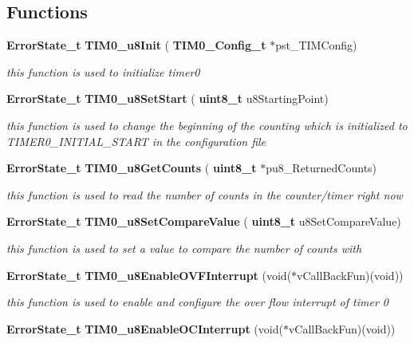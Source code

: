\subsection*{Functions}
\begin{DoxyCompactItemize}
\item 
\textbf{ Error\+State\+\_\+t} \textbf{ T\+I\+M0\+\_\+u8\+Init} (\textbf{ T\+I\+M0\+\_\+\+Config\+\_\+t} $\ast$pst\+\_\+\+T\+I\+M\+Config)
\begin{DoxyCompactList}\small\item\em this function is used to initialize timer0 \end{DoxyCompactList}\item 
\textbf{ Error\+State\+\_\+t} \textbf{ T\+I\+M0\+\_\+u8\+Set\+Start} (\textbf{ uint8\+\_\+t} u8\+Starting\+Point)
\begin{DoxyCompactList}\small\item\em this function is used to change the beginning of the counting which is initialized to T\+I\+M\+E\+R0\+\_\+\+I\+N\+I\+T\+I\+A\+L\+\_\+\+S\+T\+A\+RT in the configuration file \end{DoxyCompactList}\item 
\textbf{ Error\+State\+\_\+t} \textbf{ T\+I\+M0\+\_\+u8\+Get\+Counts} (\textbf{ uint8\+\_\+t} $\ast$pu8\+\_\+\+Returned\+Counts)
\begin{DoxyCompactList}\small\item\em this function is used to read the number of counts in the counter/timer right now \end{DoxyCompactList}\item 
\textbf{ Error\+State\+\_\+t} \textbf{ T\+I\+M0\+\_\+u8\+Set\+Compare\+Value} (\textbf{ uint8\+\_\+t} u8\+Set\+Compare\+Value)
\begin{DoxyCompactList}\small\item\em this function is used to set a value to compare the number of counts with \end{DoxyCompactList}\item 
\textbf{ Error\+State\+\_\+t} \textbf{ T\+I\+M0\+\_\+u8\+Enable\+O\+V\+F\+Interrupt} (void($\ast$v\+Call\+Back\+Fun)(void))
\begin{DoxyCompactList}\small\item\em this function is used to enable and configure the over flow interrupt of timer 0 \end{DoxyCompactList}\item 
\textbf{ Error\+State\+\_\+t} \textbf{ T\+I\+M0\+\_\+u8\+Enable\+O\+C\+Interrupt} (void($\ast$v\+Call\+Back\+Fun)(void))

\end{DoxyCompactItemize}
